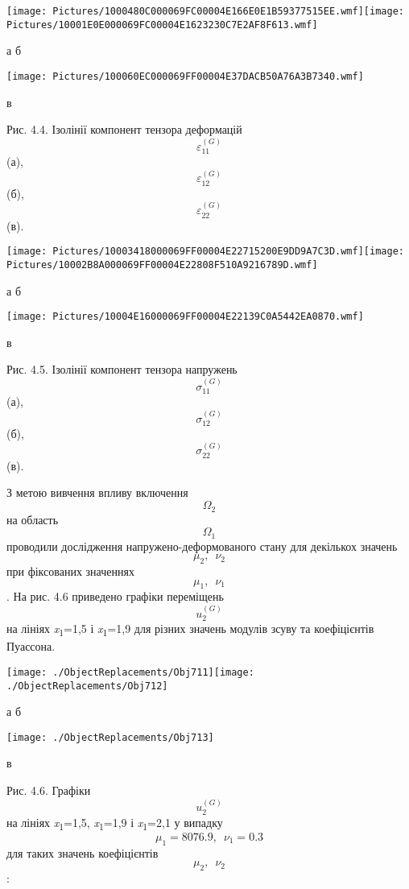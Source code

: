 \texttt{[image: Pictures/1000480C000069FC00004E166E0E1B59377515EE.wmf]}\texttt{[image: Pictures/10001E0E000069FC00004E1623230C7E2AF8F613.wmf]}

а б

\texttt{[image: Pictures/100060EC000069FF00004E37DACB50A76A3B7340.wmf]}

в

Рис. 4.4. Ізолінії компонент тензора деформацій
\[\varepsilon_{\text{11}}^{(G)}{}\] (а),
\[\varepsilon_{\text{12}}^{(G)}{}\] (б),
\[\varepsilon_{\text{22}}^{(G)}{}\] (в).

\texttt{[image: Pictures/10003418000069FF00004E22715200E9DD9A7C3D.wmf]}\texttt{[image: Pictures/10002B8A000069FF00004E22808F510A9216789D.wmf]}

а б

\texttt{[image: Pictures/10004E16000069FF00004E22139C0A5442EA0870.wmf]}

в

Рис. 4.5. Ізолінії компонент тензора напружень
\[\sigma_{\text{11}}^{(G)}{}\] (а), \[\sigma_{\text{12}}^{(G)}{}\] (б),
\[\sigma_{\text{22}}^{(G)}{}\] (в).

З метою вивчення впливу включення \[\Omega_{2}{}\] на область
\[\Omega_{1}{}\] проводили дослідження напружено-деформованого стану для
декількох значень \[{\mu_{2},\mspace{9mu}\nu_{2}}{}\] при фіксованих
значеннях \[{\mu_{1},\mspace{9mu}\nu_{1}}{}\]. На рис. 4.6 приведено
графіки переміщень \[u_{2}^{(G)}{}\] на лініях
\emph{x}\textsubscript{1}=1,5 і \emph{x}\textsubscript{1}=1,9 для різних
значень модулів зсуву та коефіцієн­тів Пуассона.

\texttt{[image: ./ObjectReplacements/Obj711]}\texttt{[image: ./ObjectReplacements/Obj712]}

а б

\texttt{[image: ./ObjectReplacements/Obj713]}

в

Рис. 4.6. Графіки \[u_{2}^{(G)}{}\] на лініях
\emph{x}\textsubscript{1}=1,5, \emph{x}\textsubscript{1}=1,9 і
\emph{x}\textsubscript{1}=2,1 у випадку
\[{{\mu_{1} = \text{8076}}\text{.}9,\mspace{9mu}{\nu_{1} = 0}\text{.}3}{}\]\textsubscript{
}для таких значень коефіцієнтів\textsubscript{
}\[{\mu_{2},\mspace{9mu}\nu_{2}}{}\]:

